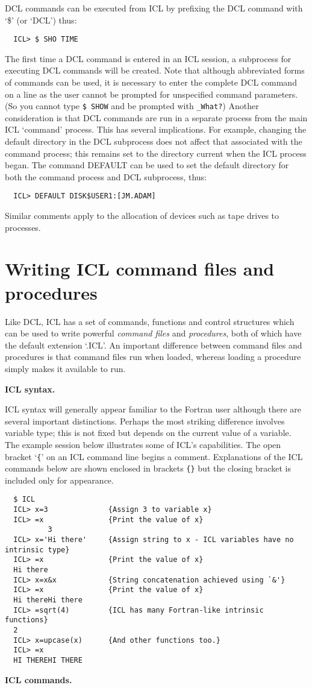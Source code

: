 DCL  commands can be executed from ICL by prefixing the DCL command with
`\$' (or `DCL') thus:
\begin{verbatim}
  ICL> $ SHO TIME
\end{verbatim}
The first time a DCL command is entered in an ICL session, a subprocess
for executing DCL commands will be created. 
Note that although abbreviated forms of commands can be used, it is 
necessary to enter the complete DCL command on a line 
as the user  cannot be prompted for unspecified command parameters.
(So you cannot type {\tt \$ SHOW} and be prompted with {\tt \_What?})
Another consideration is that DCL commands are run in a separate 
process from the main ICL `command' process. This has several 
implications. For example, changing the default directory in the DCL 
subprocess does not affect that associated with the command process; this 
remains set to
the directory current when the ICL process began.
The command DEFAULT can be used to set the default directory for 
both the command process and DCL
subprocess, thus:
\begin{verbatim}
  ICL> DEFAULT DISK$USER1:[JM.ADAM]
\end{verbatim}
Similar comments apply to the allocation of devices such as tape drives
to processes.

\newpage
\section{Writing ICL command files and procedures\label{procs}}

Like DCL, ICL has a set of commands, functions and control structures which
can be used to write powerful {\sl command files\/} and {\sl procedures},
both of which have the default extension `.ICL'.
An important difference between command files and procedures
is that command files run when loaded, whereas loading a procedure
simply makes it available to run.


{\smallskip\large\bf ICL syntax.}

ICL syntax will generally appear familiar to the Fortran user although there 
are several important distinctions.
Perhaps the most striking difference involves variable type; this
is not fixed but depends on the current value of a variable. 
The example session below illustrates some of ICL's capabilities.
The open bracket `{\tt\{}' on an ICL command line  begins a comment.
Explanations of the ICL commands below are shown enclosed in brackets
{\tt \{\}}  but the closing bracket is included only for appearance.
\begin{verbatim}
  $ ICL
  ICL> x=3              {Assign 3 to variable x}
  ICL> =x               {Print the value of x}
          3
  ICL> x='Hi there'     {Assign string to x - ICL variables have no intrinsic type}
  ICL> =x               {Print the value of x}
  Hi there
  ICL> x=x&x            {String concatenation achieved using `&'}
  ICL> =x               {Print the value of x}
  Hi thereHi there
  ICL> =sqrt(4)         {ICL has many Fortran-like intrinsic functions}
  2
  ICL> x=upcase(x)      {And other functions too.}
  ICL> =x
  HI THEREHI THERE
\end{verbatim}
{\smallskip\large\bf ICL commands.}

